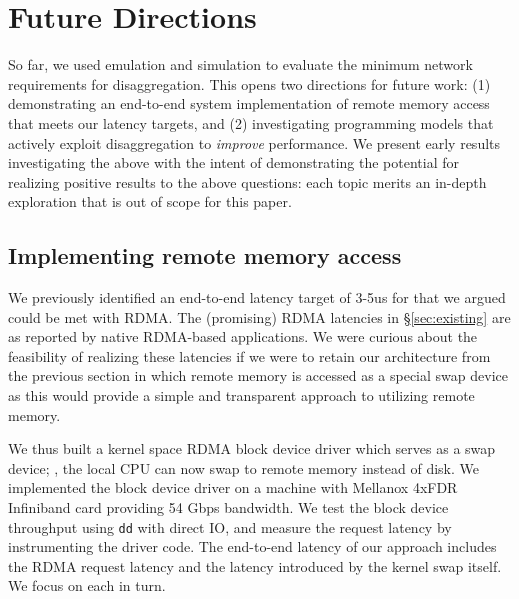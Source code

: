 \vspace{-0.1in}
\section{Future Directions}
\label{sec:future}
\vspace{-0.05in}

So far, we used emulation and simulation to evaluate the minimum network requirements for  disaggregation.%
This opens two directions for future work: (1) demonstrating an end-to-end system implementation of remote memory access that meets our latency targets, and (2) investigating programming models that actively exploit disaggregation to \emph{improve} performance.
We present early results investigating the above with the intent of demonstrating the potential for realizing positive results to the above questions: each topic merits an in-depth exploration that is out of scope for this paper.


\vspace{-0.1in}
\subsection{Implementing remote memory access}
\vspace{-0.05in}
We previously identified an end-to-end latency target of 3-5us for \dis that we argued could be met with RDMA. The (promising) RDMA latencies in \S\ref{sec:existing} are as reported by native RDMA-based applications. 
We were curious about the feasibility of realizing these latencies if we were to retain our architecture from the previous section in which remote memory is accessed as a special swap device as this would provide a simple and transparent approach to utilizing remote memory. 

We thus built a kernel space RDMA block device driver which serves as a swap device; \ie, the local CPU can now swap to remote memory instead of disk.
We implemented the block device driver on a machine with Mellanox 4xFDR Infiniband card providing 54 Gbps bandwidth.
We test the block device throughput using \texttt{dd} with direct IO, and measure the request latency by instrumenting the driver code. 
The end-to-end latency of our approach includes the RDMA request latency and the latency introduced by the kernel swap itself. We focus on each in turn. 

